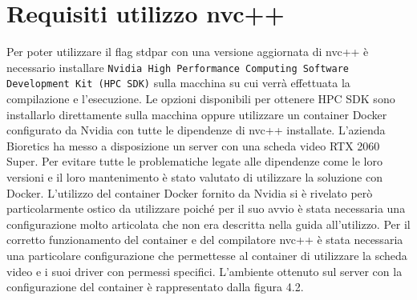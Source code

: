 \documentclass[12pt,a4paper]{report}
\begin{document}
\section{Requisiti utilizzo nvc++}
Per poter utilizzare il flag stdpar con una versione aggiornata di nvc++ è necessario installare \verb|Nvidia High Performance Computing Software Development Kit (HPC SDK)| sulla macchina su cui verrà effettuata la compilazione e l'esecuzione. Le opzioni disponibili per ottenere HPC SDK sono installarlo direttamente sulla macchina oppure utilizzare un container Docker configurato da Nvidia con tutte le dipendenze di nvc++ installate. \newline
L'azienda Bioretics ha messo a disposizione un server con una scheda video RTX 2060 Super. Per evitare tutte le problematiche legate alle dipendenze come le loro versioni e il loro mantenimento è stato valutato di utilizzare la soluzione con Docker. \newline
L'utilizzo del container Docker fornito da Nvidia si è rivelato però particolarmente ostico da utilizzare poiché per il suo avvio è stata necessaria una configurazione molto articolata che non era descritta nella guida all'utilizzo. Per il corretto funzionamento del container e del compilatore nvc++ è stata necessaria una particolare configurazione che permettesse al container di utilizzare la scheda video e i suoi driver con permessi specifici. 
L'ambiente ottenuto sul server con la configurazione del container è rappresentato dalla figura 4.2.

\begin{figure}[H]
\centering
\begin{floatrow}[1]
\end{floatrow}
\end{figure} \newpage
\end{document}
